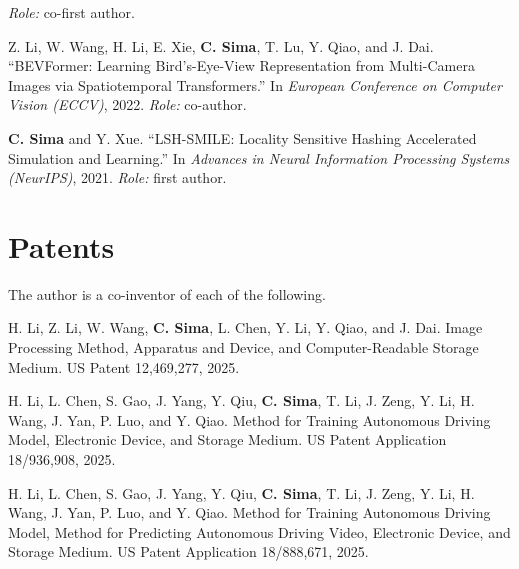 \begin{enumerate}[label={[\arabic*]}, leftmargin=*, itemsep=4pt, resume]
        \emph{Role:} co-first author.
  \item Z. Li, W. Wang, H. Li, E. Xie, \textbf{C. Sima}, T. Lu, Y. Qiao, and J. Dai.
        ``BEVFormer: Learning Bird's-Eye-View Representation from Multi-Camera Images via Spatiotemporal Transformers.''
        In \emph{European Conference on Computer Vision (ECCV)}, 2022.
        \emph{Role:} co-author.
  \item \textbf{C. Sima} and Y. Xue.
        ``LSH-SMILE: Locality Sensitive Hashing Accelerated Simulation and Learning.''
        In \emph{Advances in Neural Information Processing Systems (NeurIPS)}, 2021.
        \emph{Role:} first author.
\end{enumerate}

\section*{Patents}

\noindent The author is a co-inventor of each of the following.

\begin{enumerate}[label={[P\arabic*]}, leftmargin=*, itemsep=4pt]
  \item H. Li, Z. Li, W. Wang, \textbf{C. Sima}, L. Chen, Y. Li, Y. Qiao, and J. Dai.
        Image Processing Method, Apparatus and Device, and Computer-Readable Storage Medium.
        US Patent 12,469,277, 2025.
  \item H. Li, L. Chen, S. Gao, J. Yang, Y. Qiu, \textbf{C. Sima}, T. Li, J. Zeng, Y. Li, H. Wang, J. Yan, P. Luo, and Y. Qiao.
        Method for Training Autonomous Driving Model, Electronic Device, and Storage Medium.
        US Patent Application 18/936,908, 2025.
  \item H. Li, L. Chen, S. Gao, J. Yang, Y. Qiu, \textbf{C. Sima}, T. Li, J. Zeng, Y. Li, H. Wang, J. Yan, P. Luo, and Y. Qiao.
        Method for Training Autonomous Driving Model, Method for Predicting Autonomous Driving Video, Electronic Device, and Storage Medium.
        US Patent Application 18/888,671, 2025.
\end{enumerate}

\endgroup
